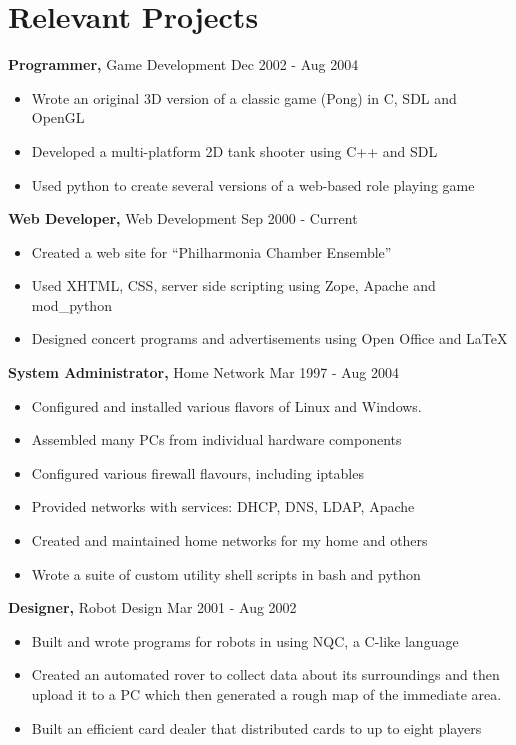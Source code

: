 \documentclass[11pt,margin,centered]{res}
\begin{document}
\section{Relevant Projects} 
{\bf Programmer,} Game Development \hfill         Dec 2002 - Aug 2004
\begin{itemize} \itemsep -1pt
    \item Wrote an original 3D version of a classic game (Pong) in C, 
	SDL and OpenGL
    \item Developed a multi-platform 2D tank shooter using C++ and SDL
    \item Used python to create several versions of a web-based role playing game
\end{itemize}

{\bf Web Developer,} Web Development \hfill Sep 2000 - Current
\begin{itemize} \itemsep -1pt
    \item Created a web site for ``Philharmonia Chamber Ensemble''
    \item Used XHTML, CSS, server side scripting using Zope, Apache and mod\_python
    \item Designed concert programs and advertisements using Open Office and \LaTeX
\end{itemize}

{\bf System Administrator,} Home Network \hfill Mar 1997 - Aug 2004
\begin{itemize} \itemsep -1pt
    \item Configured and installed various flavors of Linux and Windows.
    \item Assembled many PCs from individual hardware components
    \item Configured various firewall flavours, including iptables
    \item Provided networks with services: DHCP, DNS, LDAP, Apache
    \item Created and maintained home networks for my home and others
    \item Wrote a suite of custom utility shell scripts in bash and python 
\end{itemize}

{\bf Designer,} Robot Design \hfill Mar 2001 - Aug 2002
\begin{itemize} \itemsep -1pt
    \item Built and wrote programs for robots in using NQC, a C-like language
    \item Created an automated rover to collect data about its surroundings 
	and then upload it to a PC which then generated a rough map of the immediate area.
    \item Built an efficient card dealer that distributed cards to up to
	eight players
\end{itemize}
\end{document}
